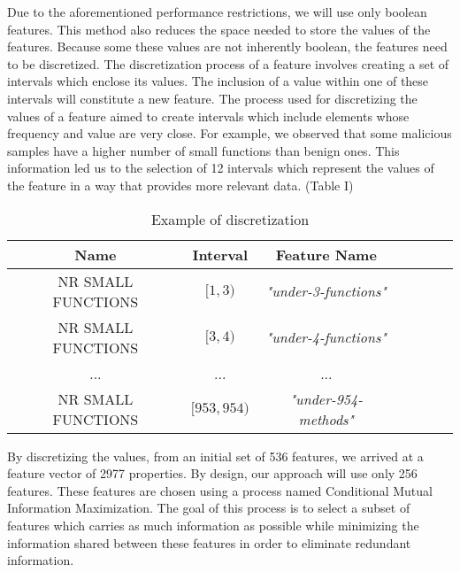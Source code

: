 Due to the aforementioned performance restrictions, we will use only boolean features. This method also reduces the space needed to store the values of the features. Because some these values are not inherently boolean, the features need to be discretized. The discretization process of a feature involves creating a set of intervals which enclose its values. The inclusion of a value within one of these intervals will constitute a new feature. The process used for discretizing the values of a feature aimed to create intervals which include elements whose frequency and value are very close.  For example, we observed that some malicious samples have a higher number of small functions than benign ones. This information led us to the selection of 12 intervals which represent the values of the feature in a way that provides more relevant data. (Table I)
\begin{table}[ht]
    \centering
    \begin{tabular}{| c | c | c | c | c | c | c | }
    \hline
    Name & Interval & Feature Name\\ \hline
    NR SMALL FUNCTIONS & $[1, 3)$ & \textit{"under-3-functions"}  \\ \hline
    NR SMALL FUNCTIONS & $[3, 4)$ & \textit{"under-4-functions"}  \\ \hline
    ... & ... & ... \\ \hline   
    NR SMALL FUNCTIONS & $[953, 954) $ & \textit{"under-954-methods"}  \\ \hline
    \end{tabular}
    \caption{Example of discretization} 
    \label{tab:discretizationeg}
\end{table}
\par
By discretizing the values, from an initial set of 536 features, we arrived at a feature vector of 2977 properties. By design, our approach will use only 256 features. These features are chosen using a process named Conditional Mutual Information Maximization. The goal of this process is to select a subset of features which carries as much information as possible while minimizing the information shared between these features in order to eliminate redundant information.